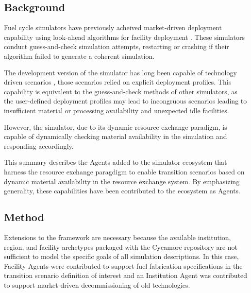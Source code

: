 

\subsection{Background}

Fuel cycle simulators have previously acheived market-driven deployment 
capability using look-ahead algorithms for facility deployment 
\cite{schneider_nfcsim_2005}.  These simulators conduct guess-and-check 
simulation attempts, restarting or crashing if their algorithm failed to 
generate a coherent simulation.


The development version of the \Cyclus simulator has long been capable of 
technology driven scenarios \cite{gidden_cyclus_2012}, those scenarios relied 
on explicit deployment profiles. This capability is equivalent to the 
guess-and-check methods of other simulators, as the user-defined deployment 
profiles may lead to incongruous scenarios leading to insufficient material or 
processing availability and unexpected idle facilities.  

However, the \Cyclus simulator, due to its dynamic resource exchange paradigm, is capable
of dynamically checking material availability in the simulation and responding
accordingly.  


This summary describes the Agents added to the \Cyclus simulator ecosystem that 
harness the resource exchange paragdigm to enable transition scenarios based on 
dynamic material availability in the resource exchange system. By emphasizing 
generality, these capabilities have been contributed to the \Cyclus ecosystem as 
Agents. 


\subsection{Method}

Extensions to the \Cyclus framework are necessary because the available
institution, region, and facility archetypes packaged with the Cycamore
repository are not sufficient to model the specific goals of all simulation 
descriptions.  In this case, Facility Agents were contributed to support fuel fabrication specifications in the transition scenario
definition of interest and an Institution Agent was contributed to support 
market-driven decommissioning of old technologies.  


